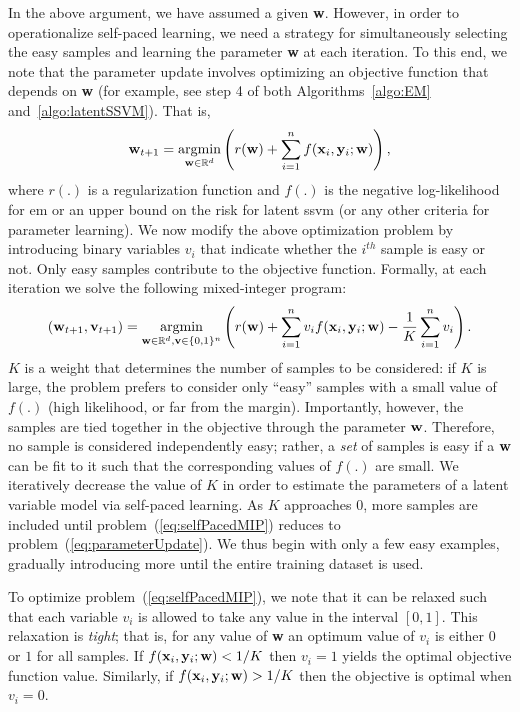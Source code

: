 \documentclass{article}
\newcommand{\argmin}{\operatornamewithlimits{argmin}}
\begin{document}
In the above argument, we have assumed a given {\bf w}. However, in
order to operationalize self-paced learning, we need a strategy for
simultaneously selecting the easy samples and learning the parameter
{\bf w} at each iteration. To this end, we note that the parameter
update involves optimizing an objective function that depends on
{\bf w} (for example, see step 4 of both Algorithms~\ref{algo:EM} and~\ref{algo:latentSSVM}). That is,
\begin{equation}
{\bf w}_{t+1} = \argmin_{{\bf w} \in \mathbb{R}^d} \left(r({\bf w}) + \sum_{i=1}^n f({\bf x}_i,{\bf y}_i; {\bf w})\right),
\label{eq:parameterUpdate}
\end{equation}
where $r(.)$ is a regularization function and $f(.)$ is the negative log-likelihood for {\sc em}
or an upper bound on the risk for latent {\sc ssvm} (or any other criteria for parameter learning).
We now modify
the above optimization problem by introducing binary variables $v_i$ that
indicate whether the $i^{th}$ sample is easy or not. Only easy samples contribute to the objective function.
Formally, at each iteration we solve the following mixed-integer
program:
\begin{equation}
({\bf w}_{t+1}, {\bf v}_{t+1}) = \argmin_{{\bf w} \in \mathbb{R}^d,{\bf v} \in \{0,1\}^n}
\left(r({\bf w}) + \sum_{i=1}^n v_if({\bf x}_i,{\bf y}_i; {\bf w}) -
\frac{1}{K}\sum_{i=1}^n v_i\right).
\label{eq:selfPacedMIP}
\end{equation}
$K$ is a weight that determines the number of samples to be
considered: if $K$ is large, the problem prefers to consider only
``easy'' samples with a small value of $f(.)$ (high likelihood, or far
from the margin). Importantly, however, the samples are tied together
in the objective through the parameter ${\bf w}$. Therefore, no sample
is considered independently easy; rather, a \emph{set} of samples is
easy if a ${\bf w}$ can be fit to it such that the corresponding
values of $f(.)$ are small.  We iteratively decrease the value of $K$
in order to estimate the parameters of a latent variable model via
self-paced learning. As $K$ approaches $0$, more samples are included
until problem~(\ref{eq:selfPacedMIP}) reduces to
problem~(\ref{eq:parameterUpdate}). We thus begin with only a few easy
examples, gradually introducing more until the entire training dataset
is used.

To optimize problem~(\ref{eq:selfPacedMIP}), we note that it can be relaxed such that each variable $v_i$ is allowed to take any value
in the interval $[0,1]$. This relaxation is {\em tight}; that is, for any value
of {\bf w} an optimum value of $v_i$ is either $0$ or $1$ for all samples. 
If $f({\bf x}_i,{\bf y}_i;{\bf w}) < 1/K$ then $v_i = 1$ yields the optimal objective function value. Similarly, if
$f({\bf x}_i,{\bf y}_i;{\bf w}) > 1/K$ then the objective is optimal when $v_i = 0$. 
\end{document}

